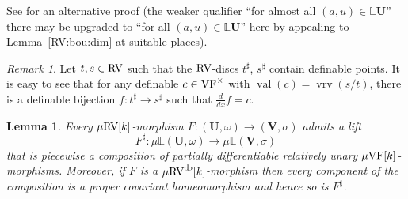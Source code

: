 \documentclass[12pt]{amsart}
\theoremstyle{plain}
\newtheorem{lem}[thm]{Lemma}
\theoremstyle{definition}
\theoremstyle{remark}
\newtheorem{rem}[thm]{Remark}
\numberwithin{equation}{section}
\theoremstyle{plain}
\newcommand{\VF}{\textup{VF}}
\newcommand{\RV}{\textup{RV}}
\newcommand{\0}{\emptyset}
\newcommand{\bb}[1]{\mathbb{#1}}
\newcommand{\fun}{\longrightarrow}
\newcommand{\mVF}{{\mu}{\VF}}
\newcommand{\mRV}{{\mu}{\RV}}
\DeclareMathOperator{\vv}{val}
\DeclareMathOperator{\vrv}{vrv}
\DeclareMathOperator{\db}{d \! b}
\newcommand{\ddx}{\tfrac{d}{d x}}
\begin{document}
See \cite[Corollary~7.7]{Yin:special:trans} for an alternative proof (the weaker qualifier ``for almost all $(a, u) \in \bb L \bm U$'' there may be upgraded to ``for all $(a, u) \in \bb L \bm U$'' here by appealing to Lemma~\ref{RV:bou:dim} at suitable places).

\begin{rem}\label{rvdisc:stre}
Let $t, s \in \RV$ such that the $\RV$-discs $t^\sharp$, $s^\sharp$ contain definable points. It is easy to see that for any definable $c \in \VF^\times$ with $\vv(c) = \vrv(s/t)$, there is a definable bijection $f : t^\sharp \fun s^\sharp$ such that $\ddx f = c$.
\end{rem}


\begin{lem}\label{L:measure:class:lift}
Every $\mRV[k]$-morphism $F : (\bm U, \omega) \fun (\bm V, \sigma)$ admits a lift
\[
F^\sharp: {\mu}\bb{L}(\bm U, \omega) \fun {\mu}\bb{L}(\bm V, \sigma)
\]
that is piecewise a composition of partially differentiable relatively unary $\mVF[k]$-morphisms. Moreover, if $F$ is a $\mRV^{\db}[k]$-morphism then every component of the composition is a  proper covariant homeomorphism and hence so is $F^\sharp$.
\end{lem}
\end{document}
